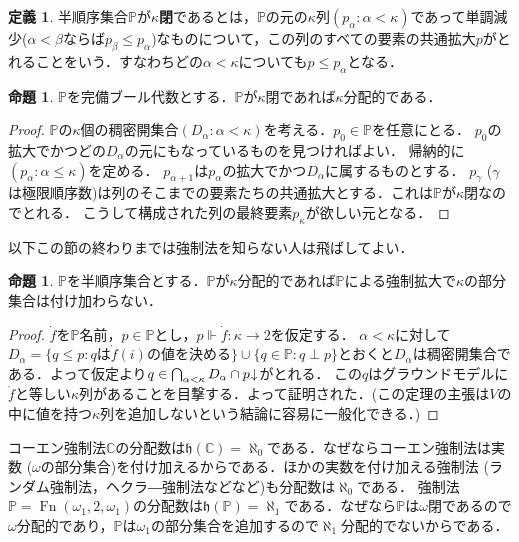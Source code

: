 \documentclass[uplatex,dvipdfmx]{jsarticle}
\renewcommand{\P}{\mathbb{P}}
\newcommand{\C}{\mathbb{C}}
\newcommand\forces{\Vdash}
\newcommand{\h}{\mathfrak{h}}
\newcommand{\down}{\hspace{-0.2em}\downarrow}
\theoremstyle{definition}
\newtheorem*{defi*}{定義}
\newtheorem{prop}[thm]{命題}
\theoremstyle{named}
\begin{document}
\begin{defi*}
半順序集合$\P$が{\bfseries $\kappa$閉}であるとは，$\P$の元の$\kappa$列$(p_\alpha : \alpha < \kappa)$であって単調減少($\alpha < \beta$ならば$p_\beta \le p_\alpha$)なものについて，この列のすべての要素の共通拡大$p$がとれることをいう．すなわちどの$\alpha < \kappa$についても$p \le p_\alpha$となる．
\end{defi*}

\begin{prop}
$\P$を完備ブール代数とする．$\P$が$\kappa$閉であれば$\kappa$分配的である．
\end{prop}
\begin{proof}
$\P$の$\kappa$個の稠密開集合$(D_\alpha : \alpha < \kappa)$を考える．$p_0 \in \P$を任意にとる．
$p_0$の拡大でかつどの$D_\alpha$の元にもなっているものを見つければよい．
帰納的に$(p_\alpha : \alpha \le \kappa)$を定める．
$p_{\alpha + 1}$は$p_\alpha$の拡大でかつ$D_\alpha$に属するものとする．
$p_\gamma$ ($\gamma$は極限順序数)は列のそこまでの要素たちの共通拡大とする．これは$\P$が$\kappa$閉なのでとれる．
こうして構成された列の最終要素$p_\kappa$が欲しい元となる．
\end{proof}

以下この節の終わりまでは強制法を知らない人は飛ばしてよい．

\begin{prop} \label{nonewreal} \cite[Theorem 15.6.]{jech2007set}
$\P$を半順序集合とする．$\P$が$\kappa$分配的であれば$\P$による強制拡大で$\kappa$の部分集合は付け加わらない．
\end{prop}
\begin{proof}
$\dot{f}$を$\P$名前，$p \in \P$とし，$p \forces \dot{f}: \kappa \to 2$を仮定する．
$\alpha < \kappa$に対して$D_\alpha = \{ q \le p : \text{$q$は$\dot{f}(i)$の値を決める} \} \cup \{q \in \P : q \perp p \}$とおくと$D_\alpha$は稠密開集合である．よって仮定より$q \in \bigcap_{\alpha < \kappa} D_\alpha \cap p\down$がとれる．
この$q$はグラウンドモデルに$\dot{f}$と等しい$\kappa$列があることを目撃する．よって証明された．(この定理の主張は$V$の中に値を持つ$\kappa$列を追加しないという結論に容易に一般化できる．)
\end{proof}

コーエン強制法$\C$の分配数は$\h(\C) = \aleph_0$である．なぜならコーエン強制法は実数 ($\omega$の部分集合)を付け加えるからである．ほかの実数を付け加える強制法 (ランダム強制法，ヘクラ―強制法などなど)も分配数は$\aleph_0$である．
強制法$\P = \operatorname{Fn}(\omega_1, 2, \omega_1)$の分配数は$\h(\P) = \aleph_1$である．なぜなら$\P$は$\omega$閉であるので$\omega$分配的であり，$\P$は$\omega_1$の部分集合を追加するので$\aleph_1$分配的でないからである．
\end{document}
